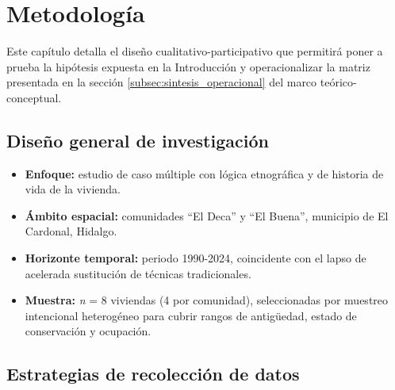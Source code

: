 \section{Metodología}

Este capítulo detalla el diseño cualitativo-participativo que permitirá
poner a prueba la hipótesis expuesta en la Introducción y operacionalizar
la matriz presentada en la sección \ref{subsec:sintesis_operacional} del
marco teórico-conceptual.

\subsection{Diseño general de investigación}

\begin{itemize}
	\item \textbf{Enfoque:} estudio de caso múltiple con lógica etnográfica
	      y de historia de vida de la vivienda.
	\item \textbf{Ámbito espacial:} comunidades ``El Deca'' y ``El Buena'',
	      municipio de El Cardonal, Hidalgo.
	\item \textbf{Horizonte temporal:} periodo 1990-2024, coincidente con
	      el lapso de acelerada sustitución de técnicas tradicionales.
	\item \textbf{Muestra:} \emph{n} = 8 viviendas
	      (4 por comunidad), seleccionadas por muestreo
	      intencional heterogéneo para cubrir rangos de antigüedad,
	      estado de conservación y ocupación.
\end{itemize}

\subsection{Estrategias de recolección de datos}

